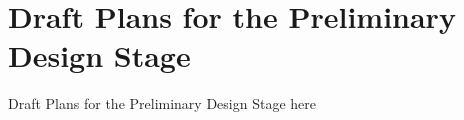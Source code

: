 \chapter{Draft Plans for the Preliminary Design Stage}
Draft Plans for the Preliminary Design Stage here
